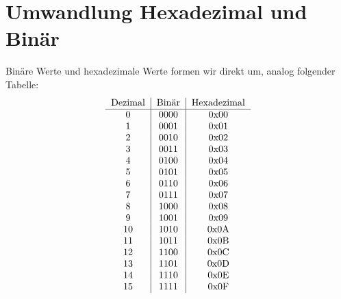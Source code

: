 \documentclass[a4paper,10pt]{report}
\begin{document}
\section{Umwandlung Hexadezimal und Binär}
Binäre Werte und hexadezimale Werte formen wir direkt um, analog folgender Tabelle:\begin{equation}\begin{tabular}{c | c | c}
Dezimal & Binär & Hexadezimal\\
\hline
0 & 0000 & 0x00\\
1 & 0001 & 0x01\\
2 & 0010 & 0x02\\
3 & 0011 & 0x03\\
4 & 0100 & 0x04\\
5 & 0101 & 0x05\\
6 & 0110 & 0x06\\
7 & 0111 & 0x07\\
8 & 1000 & 0x08\\
9 & 1001 & 0x09\\
10 & 1010 & 0x0A\\
11 & 1011 & 0x0B\\
12 & 1100 & 0x0C\\
13 & 1101 & 0x0D\\
14 & 1110 & 0x0E\\
15 & 1111 & 0x0F\\
\end{tabular}\end{equation}
\end{document}
